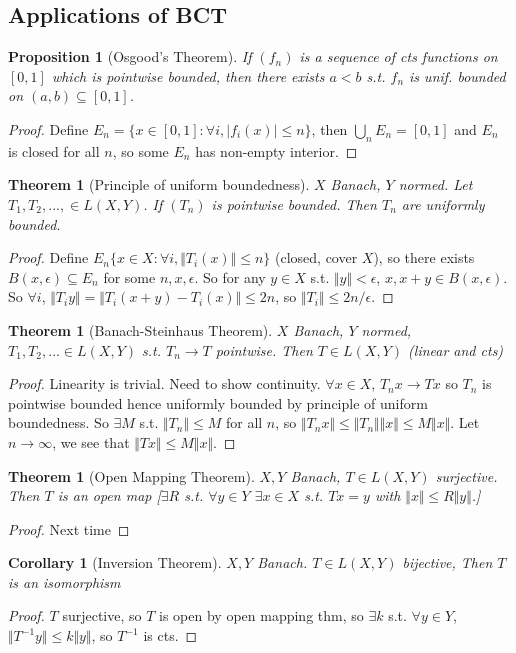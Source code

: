 \documentclass{article}
\theoremstyle{definition}
\theoremstyle{remark}
\theoremstyle{plain}
\newtheorem{thm}[defn]{Theorem}
\newtheorem{prop}[defn]{Proposition}
\newtheorem{crly}[defn]{Corollary}
\begin{document}
\subsection{Applications of BCT}
\begin{prop}[Osgood's Theorem]
    If $(f_n)$ is a sequence of cts functions on $[0,1]$ which is pointwise bounded, then there exists $a<b$ s.t. $f_n$ is unif. bounded on $(a,b)\subseteq[0,1]$.
\end{prop}
\begin{proof}
    Define $E_n=\{x\in[0,1]:\forall i, |f_i(x)|\le n\}$, then $\bigcup_nE_n=[0,1]$ and $E_n$ is closed for all $n$, so some $E_n$ has non-empty interior.
\end{proof}
\begin{thm}[Principle of uniform boundedness]
$X$ Banach, $Y$ normed. Let $T_1,T_2,...,\in L(X,Y)$. If $(T_n)$ is pointwise bounded. Then $T_n$ are uniformly bounded.    
\end{thm}
\begin{proof}
    Define $E_n\{x\in X:\forall i,\Vert T_i(x)\Vert\le n\}$ (closed, cover $X$), so there exists $B(x,\epsilon)\subseteq E_n$ for some $n,x,\epsilon$. So for any $y\in X$ s.t. $\Vert y\Vert<\epsilon$, $x,x+y\in B(x,\epsilon)$. So $\forall i$, $\Vert T_iy\Vert=\Vert T_i(x+y)-T_i(x)\Vert\le 2n$, so $\Vert T_i\Vert\le 2n/\epsilon$.
\end{proof}
\begin{thm}[Banach-Steinhaus Theorem]
    $X$ Banach, $Y$ normed, $T_1,T_2,...\in L(X,Y)$ s.t. $T_n\to T$ pointwise. Then $T\in L(X,Y)$ (linear and cts)
\end{thm}
\begin{proof}
    Linearity is trivial. Need to show continuity.
    $\forall x\in X$, $T_nx\to Tx$ so $T_n$ is pointwise bounded hence uniformly bounded by principle of uniform boundedness. So $\exists M$ s.t. $\Vert T_n\Vert\le M$ for all $n$, so $\Vert T_nx\Vert\le\Vert T_n\Vert \Vert x\Vert\le M\Vert x\Vert$. Let $n\to\infty$, we see that $\Vert Tx\Vert\le M\Vert x\Vert$.
\end{proof}
\begin{thm}[Open Mapping Theorem]
    $X,Y$ Banach, $T\in L(X,Y)$ surjective. Then $T$ is an open map [$\exists R$ s.t. $\forall y\in Y$ $\exists x\in X$ s.t. $Tx=y$ with $\Vert x\Vert \le R\Vert y\Vert$.]
\end{thm}
\begin{proof}
    Next time
\end{proof}
\begin{crly}[Inversion Theorem]
    $X,Y$ Banach. $T\in L(X,Y)$ bijective, Then $T$ is an isomorphism
\end{crly}
\begin{proof}
    $T$ surjective, so $T$ is open by open mapping thm, so $\exists k$ s.t. $\forall y\in Y$, $\Vert T^{-1}y\Vert\le k\Vert y\Vert$, so $T^{-1}$ is cts.
\end{proof}
\end{document}
